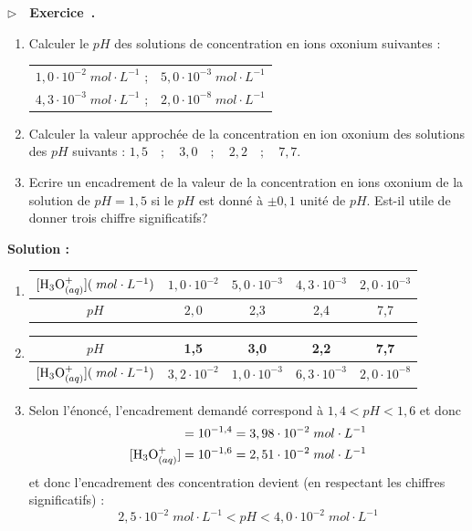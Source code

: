\documentclass[11pt,a4paper]{article}
\newcommand{\mpl}{\; mol\cdot L^{-1}}
\newcommand{\es}[1]{\cdot10^{#1}}
\newcommand{\oxo}{\ce{H3O+}_{(aq)}}
\newcounter{exo}
\newenvironment{exo}[1][]
 {\refstepcounter{exo} \begin{shaded}\noindent $\triangleright \quad$\textbf{Exercice~\theexo. #1} } { \end{shaded}}
\begin{document}
\begin{exo}
\begin{enumerate}
    \item Calculer le $pH$ des solutions de concentration en ions oxonium suivantes : 
    \begin{center}
      \begin{tabular}{c c}
        $1,0\es{-2} \mpl$ \quad ;  & $5,0\es{-3} \mpl$ \\
        $4,3\es{-3} \mpl$ \quad ; & $2,0\es{-8} \mpl$ \\
    \end{tabular}  
    \end{center}
    \item Calculer la valeur approchée de la concentration en ion oxonium des solutions des $pH$ suivants : $1,5 \quad ; \quad 3,0 \quad ; \quad 2,2 \quad ; \quad 7,7$.
    \item Ecrire un encadrement de la valeur de la concentration en ions oxonium de la solution de $pH = 1,5$ si le $pH$ est donné à $\pm 0,1$ unité de $pH$. Est-il utile de donner trois chiffre significatifs? 
\end{enumerate}    

\textbf{Solution : }
\begin{enumerate}
    \item 
    
    \begin{tabular}{c||c|c|c|c}
         $[\oxo](\mpl)$ & $1,0\es{-2}$  & $5,0\es{-3} $ & $4,3\es{-3}$ & $2,0\es{-3} $ \\ \hline
         $pH$ &  $2,0$ & 2,3 & 2,4 & 7,7 
    \end{tabular}    
    \vspace{0.5cm}
    \item     
    
    \begin{tabular}{c||c|c|c|c}
         $pH$ &  1,5 & 3,0 & 2,2 & 7,7  \\ \hline
         $[\oxo](\mpl)$ & $3,2\es{-2}$  & $1,0\es{-3} $ & $6,3\es{-3}$ & $2,0\es{-8} $         
    \end{tabular}    
    \vspace{0.5cm}
    \item Selon l'énoncé, l'encadrement demandé correspond à $1,4 < pH < 1,6$ et donc 
       \begin{align*}
        [\oxo] &= 10^{-1,4} = 3,98\es{-2}\mpl \\
        [\oxo] &= 10^{-1,6} = 2,51\es{-2}\mpl
    \end{align*}    
    et donc l'encadrement des concentration devient (en respectant les chiffres significatifs) : 
    $$ 2,5\es{-2}\mpl < pH < 4,0 \es{-2}\mpl$$
\end{enumerate}
\end{exo}	
\end{document}
